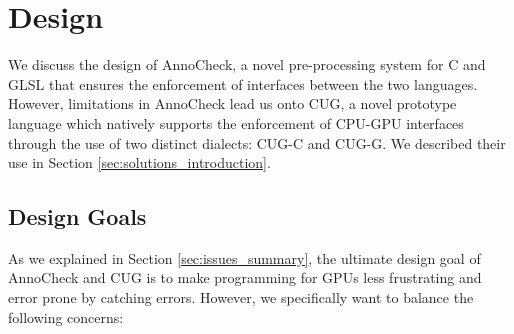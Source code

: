 \documentclass[a4paper,12pt,twoside,openright]{report}
\begin{document}





\chapter{Design}

We discuss the design of AnnoCheck, a novel pre-processing system for C and
GLSL that ensures the enforcement of interfaces between the two languages.
However, limitations in AnnoCheck lead us onto CUG, a novel prototype language
which natively supports the enforcement of CPU-GPU interfaces through the use
of two distinct dialects: CUG-C and CUG-G. We described their use in Section
\ref{sec:solutions_introduction}.

\section{Design Goals}

As we explained in Section \ref{sec:issues_summary}, the ultimate design goal
of AnnoCheck and CUG is to make programming for GPUs less frustrating and error
prone by catching errors. However, we specifically want to balance the
following concerns:
\end{document}
